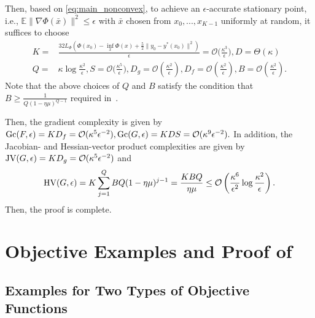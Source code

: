 \documentclass{osudissert96}
\begin{document}
Then, based on \cref{eq:main_nonconvex},  to achieve an $\epsilon$-accurate stationary point, i.e., $\mathbb{E}\|\nabla\Phi(\bar x)\|^2\leq \epsilon$ with $\bar x$ chosen from $x_0,...,x_{K-1}$ uniformly at random, it suffices to choose
\begin{align*}
K =&  \frac{32L_\Phi(\Phi(x_0)-\inf_x\Phi(x)+\frac{5}{2}\|y_0-y^*(x_0)\|^2) }{\epsilon}=\mathcal{O}\Big(\frac{\kappa^3}{\epsilon}\Big), D=\Theta(\kappa)\nonumber
\\Q = & \kappa\log \frac{\kappa^2}{\epsilon}, S = \mathcal{O}\Big(\frac{\kappa^5}{\epsilon}\Big),D_g =\mathcal{O}\left(\frac{\kappa^2}{\epsilon}\right), D_f =\mathcal{O}\left(\frac{\kappa^2}{\epsilon}\right), B =\mathcal{O}\left(\frac{\kappa^2}{\epsilon}\right).
\end{align*}
Note that the above choices of $Q$ and $B$ satisfy the condition that $B\geq \frac{1}{Q(1-\eta\mu)^{Q-1}}$ required in~. %

Then, the gradient complexity is given by $\mbox{\normalfont Gc}(F,\epsilon)=KD_f=\mathcal{O}(\kappa^5\epsilon^{-2}), \mbox{\normalfont Gc}(G,\epsilon)=KDS=\mathcal{O}(\kappa^9\epsilon^{-2}).$
In addition, the Jacobian- and Hessian-vector product complexities are given by $ \mbox{\normalfont JV}(G,\epsilon)=KD_g=\mathcal{O}(\kappa^5\epsilon^{-2})$ and 
\begin{align*}
\mbox{\normalfont HV}(G,\epsilon) = K \sum_{j=1}^Q BQ(1-\eta\mu)^{j-1}=\frac{KBQ}{\eta\mu} \leq\mathcal{O}\left( \frac{\kappa^6}{\epsilon^{2}}\log \frac{\kappa^2}{\epsilon} \right).
\end{align*}
Then, the proof is complete. 

\chapter{Objective Examples and Proof of }\label{append: maml}

\section{Examples for Two Types of Objective Functions}\label{ggpopssasdasdax}
\end{document}
